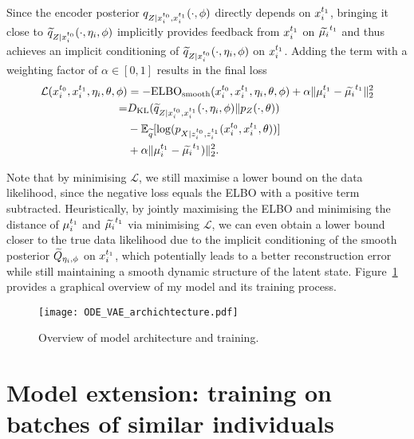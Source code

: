 Since the encoder posterior $q_{Z\mid x_i^{t_0}, x_i^{t_1}}(\cdot,\phi)$ directly depends on $x_i^{t_1}$, bringing it close to $\widetilde{q}_{Z\mid x_i^{t_0}}(\cdot, \eta_i, \phi)$ implicitly provides feedback from $x_i^{t_1}$ on $\widetilde{\mu_i}^{t_1}$ and thus achieves an implicit conditioning of $\widetilde{q}_{Z\mid x_i^{t_0}}(\cdot, \eta_i, \phi)$ on $x_i^{t_1}$. Adding the term with a weighting factor of $\alpha\in[0,1]$ results in the final loss
\begin{equation} \label{finalELBO}
\begin{split}
\mathcal{L}(x_i^{t_0}, x_i^{t_1}, \eta_i, \theta, \phi) &= -\mathrm{ELBO}_{\mathrm{smooth}}(x_i^{t_0}, x_i^{t_1}, \eta_i, \theta, \phi) + \alpha\Vert\mu_i^{t_1} - \widetilde{\mu_i}^{t_1}\Vert_2^2 \\
=&D_{\mathrm{KL}}(\widetilde{q}_{Z\mid x_i^{t_0}, x_i^{t_1}}(\cdot, \eta_i, \phi) \Vert p_Z(\cdot,\theta)) \\
&- \mathbb{E}_{\widetilde{q}}[\log(p_{X\mid z_i^{t_0}, z_i^{t_1}}(x_i^{t_0}, x_i^{t_1},\theta))]\\
&+ \alpha\Vert\mu_i^{t_1} - \widetilde{\mu_i}^{t_1})\Vert_2^2.
\end{split}
\end{equation}

Note that by minimising $\mathcal{L}$, we still maximise a lower bound on the data likelihood, since the negative loss equals the ELBO with a positive term subtracted. Heuristically, by jointly maximising the ELBO and minimising the distance of $\mu_i^{t_1}$ and $\widetilde{\mu_i}^{t_1}$ via minimising $\mathcal{L}$, we can even obtain a lower bound closer to the true data likelihood due to the implicit conditioning of the smooth posterior $\widetilde{Q}_{\eta_i, \phi}$ on $x_i^{t_1}$, which potentially leads to a better reconstruction error while still maintaining a smooth dynamic structure of the latent state. 
Figure~\ref{fig:node_vae_architecture_draft} provides a graphical overview of my model and its training process. 

\begin{figure}[H]
	\texttt{[image: ODE\_VAE\_archichtecture.pdf]}
	\caption{Overview of model architecture and training.}
	\label{fig:node_vae_architecture_draft}
\end{figure}

\section{Model extension: training on batches of similar individuals}\label{sec:methods-minibatches}

